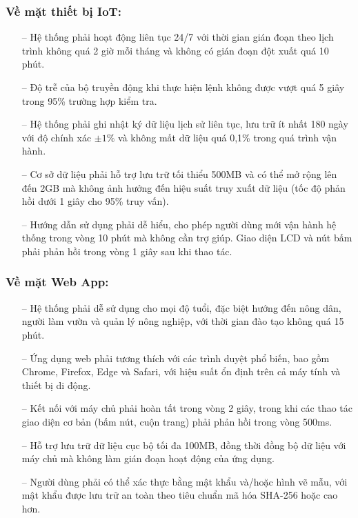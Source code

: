 \subsubsection{Về mặt thiết bị IoT:}
\begin{itemize}
    \item [--] Hệ thống phải hoạt động liên tục 24/7 với thời gian gián đoạn theo lịch trình không quá 2 giờ mỗi tháng và không có gián đoạn đột xuất quá 10 phút.
    \item [--] Độ trễ của bộ truyền động khi thực hiện lệnh không được vượt quá 5 giây trong 95\% trường hợp kiểm tra.
    \item [--] Hệ thống phải ghi nhật ký dữ liệu lịch sử liên tục, lưu trữ ít nhất 180 ngày với độ chính xác $\pm 1\%$ và không mất dữ liệu quá 0,1\% trong quá trình vận hành.
    \item [--] Cơ sở dữ liệu phải hỗ trợ lưu trữ tối thiểu 500MB và có thể mở rộng lên đến 2GB mà không ảnh hưởng đến hiệu suất truy xuất dữ liệu (tốc độ phản hồi dưới 1 giây cho 95\% truy vấn).
    \item [--] Hướng dẫn sử dụng phải dễ hiểu, cho phép người dùng mới vận hành hệ thống trong vòng 10 phút mà không cần trợ giúp. Giao diện LCD và nút bấm phải phản hồi trong vòng 1 giây sau khi thao tác.
\end{itemize}

\subsubsection{Về mặt Web App:}
\begin{itemize}
     \item [--] Hệ thống phải dễ sử dụng cho mọi độ tuổi, đặc biệt hướng đến nông dân, người làm vườn và quản lý nông nghiệp, với thời gian đào tạo không quá 15 phút.
     \item [--] Ứng dụng web phải tương thích với các trình duyệt phổ biến, bao gồm Chrome, Firefox, Edge và Safari, với hiệu suất ổn định trên cả máy tính và thiết bị di động.
     \item [--] Kết nối với máy chủ phải hoàn tất trong vòng 2 giây, trong khi các thao tác giao diện cơ bản (bấm nút, cuộn trang) phải phản hồi trong vòng 500ms.
     \item [--] Hỗ trợ lưu trữ dữ liệu cục bộ tối đa 100MB, đồng thời đồng bộ dữ liệu với máy chủ mà không làm gián đoạn hoạt động của ứng dụng.
     \item [--] Người dùng phải có thể xác thực bằng mật khẩu và/hoặc hình vẽ mẫu, với mật khẩu được lưu trữ an toàn theo tiêu chuẩn mã hóa SHA-256 hoặc cao hơn.
\end{itemize}

\newpage






